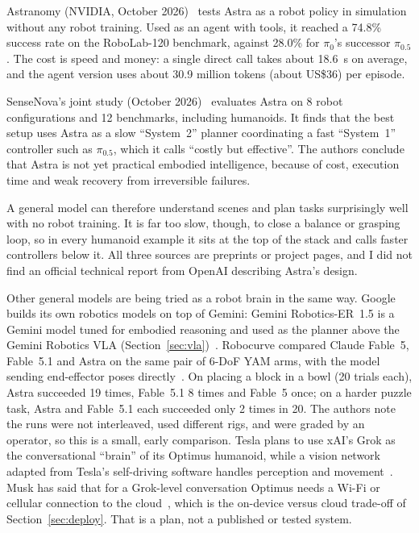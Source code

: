 \documentclass[11pt,a4paper]{article}
\begin{document}
Astranomy (NVIDIA, October 2026)~\cite{astranomy-2026} tests Astra as a robot
policy in simulation without any robot training.  Used as an agent with tools,
it reached a 74.8\% success rate on the RoboLab-120 benchmark, against 28.0\%
for $\pi_0$'s successor $\pi_{0.5}$.  The cost is speed and money: a single
direct call takes about 18.6~s on average, and the agent version uses about
30.9 million tokens (about US\$36) per episode.

SenseNova's joint study (October 2026)~\cite{sensenova-2026} evaluates Astra on
8 robot configurations and 12 benchmarks, including humanoids.  It finds that
the best setup uses Astra as a slow ``System~2'' planner coordinating a fast
``System~1'' controller such as $\pi_{0.5}$, which it calls ``costly but
effective''.  The authors conclude that Astra is not yet practical embodied
intelligence, because of cost, execution time and weak recovery from
irreversible failures.

A general model can therefore understand scenes and plan tasks surprisingly
well with no robot training.  It is far too slow, though, to close a balance or
grasping loop, so in every humanoid example it sits at the top of the stack and
calls faster controllers below it.  All three sources are preprints or project
pages, and I did not find an official technical report from OpenAI describing
Astra's design.

Other general models are being tried as a robot brain in the same way.  Google
builds its own robotics models on top of Gemini: Gemini Robotics-ER~1.5 is a
Gemini model tuned for embodied reasoning and used as the planner above the
Gemini Robotics VLA (Section~\ref{sec:vla})~\cite{gemini-15}.  Robocurve
compared Claude Fable~5, Fable~5.1 and Astra on the same pair of 6-DoF YAM
arms, with the model sending end-effector poses
directly~\cite{robocurve-astra}.  On placing a block in a bowl (20 trials
each), Astra succeeded 19 times, Fable~5.1 8 times and Fable~5 once; on a
harder puzzle task, Astra and Fable~5.1 each succeeded only 2 times in 20.
The authors note the runs were not interleaved, used different rigs, and were
graded by an operator, so this is a small, early comparison.  Tesla plans to
use xAI's Grok as the conversational ``brain'' of its Optimus humanoid, while a
vision network adapted from Tesla's self-driving software handles perception
and movement~\cite{grok-optimus,investorplace-optimus}.  Musk has said that for
a Grok-level conversation Optimus needs a Wi-Fi or cellular connection to the
cloud~\cite{optimus-wiki}, which is the on-device versus cloud trade-off of
Section~\ref{sec:deploy}.  That is a plan, not a published or tested system.
\end{document}
